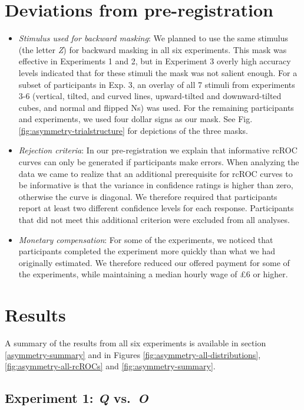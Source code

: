 \documentclass[12pt,twoside]{reedthesis}
\begin{document}
\hypertarget{deviations}{%
\section{Deviations from pre-registration}\label{deviations}}
\begin{itemize}
\item
  \emph{Stimulus used for backward masking}: We planned to use the same stimulus (the letter \emph{Z}) for backward masking in all six experiments. This mask was effective in Experiments 1 and 2, but in Experiment 3 overly high accuracy levels indicated that for these stimuli the mask was not salient enough. For a subset of participants in Exp. 3, an overlay of all 7 stimuli from experiments 3-6 (vertical, tilted, and curved lines, upward-tilted and downward-tilted cubes, and normal and flipped Ns) was used. For the remaining participants and experiments, we used four dollar signs as our mask. See Fig. \ref{fig:asymmetry-trialstructure} for depictions of the three masks.
\item
  \emph{Rejection criteria}: In our pre-registration we explain that informative rcROC curves can only be generated if participants make errors. When analyzing the data we came to realize that an additional prerequisite for rcROC curves to be informative is that the variance in confidence ratings is higher than zero, otherwise the curve is diagonal. We therefore required that participants report at least two different confidence levels for each response. Participants that did not meet this additional criterion were excluded from all analyses.
\item
  \emph{Monetary compensation}: For some of the experiments, we noticed that participants completed the experiment more quickly than what we had originally estimated. We therefore reduced our offered payment for some of the experiments, while maintaining a median hourly wage of £6 or higher.
\end{itemize}
\hypertarget{results-8}{%
\section{Results}\label{results-8}}

A summary of the results from all six experiments is available in section \ref{asymmetry-summary} and in Figures \ref{fig:asymmetry-all-distributions}, \ref{fig:asymmetry-all-rcROCs} and \ref{fig:asymmetry-summary}.

\hypertarget{experiment-1-q-vs.-o}{%
\subsection{\texorpdfstring{Experiment 1: \emph{Q} vs.~\emph{O}}{Experiment 1: Q vs.~O}}\label{experiment-1-q-vs.-o}}
\end{document}
